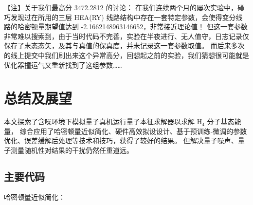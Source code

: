 \documentclass[withoutpreface,bwprint]{cumcmthesis}
\begin{document}
【注】关于我们最高分 3472.2812 的讨论：
在我们连续两个月的屡次实验中，碰巧发现过在所用的三层 HEA(RY) 线路结构中存在一套特定参数，会使得变分线路的哈密顿量期望值达到 -2.1662148963146652，非常接近理论值！
但这一套参数非常难以搜索到，由于当时代码不完善，实验在半夜进行、无人值守，日志记录仅保存了末态态矢，及其与真值的保真度，并未记录这一套参数取值。
而后来多次的线上提交中我们刷出来这个异常高分，回想起之前的实验，我们猜想很可能就是优化器撞运气又重新找到了这组参数……


\section{总结及展望}

本文探索了含噪环境下模拟量子真机运行量子本征求解器以求解 $ \mathrm{H}_4 $ 分子基态能量，
综合应用了哈密顿量近似简化、硬件高效拟设设计、基于预训练-微调的参数优化、误差缓解后处理等技术和技巧，获得了较好的结果。
但解决量子噪声、量子测量随机性对结果的干扰仍然任重道远。


\newpage
\nocite{*}


\newpage
\begin{appendices}

\section{主要代码}

哈密顿量近似简化：



\end{appendices}
\end{document}
